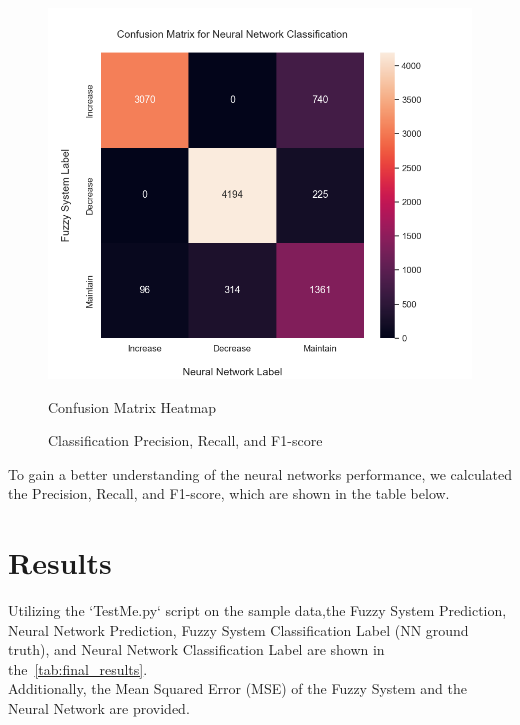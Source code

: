\documentclass[titlepage]{article}
\begin{document}
\begin{figure}[H]
\centering
\begin{minipage}{0.55\textwidth}
\includegraphics[width=\textwidth]{../images/classification/confusion_heatmap}
\caption{Confusion Matrix Heatmap}
\label{fig:confusion_matrix_heatmap}
\end{minipage}
\qquad
\begin{minipage}{0.4\textwidth}
\begin{table}[H]
    \centering
    
    \caption{Classification  Precision, Recall, and F1-score}
    \label{tab:classification_scores}
\end{table}
\end{minipage}

\end{figure}

To gain a better understanding of the neural networks performance, we calculated the Precision, Recall, and F1-score, which are shown in the table below.


\newpage
\part{Results}

Utilizing the `TestMe.py` script on the sample data,the
Fuzzy System Prediction, Neural Network Prediction, Fuzzy System Classification Label (NN ground truth), and Neural Network Classification Label
are shown in the~\cref{tab:final_results}. \\
Additionally, the Mean Squared Error (MSE) of the Fuzzy System and the Neural Network are provided.
\end{document}
